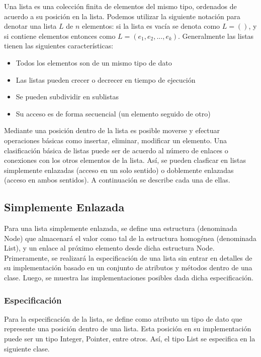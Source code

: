 Una lista es una colección finita de elementos del mismo tipo, ordenados de acuerdo a su posición en la lista. Podemos utilizar la siguiente notación para denotar una lista $L$ de $n$ elementos: si la lista es vacía se denota como $L=()$, y si contiene elementos entonces como $L=(e_1, e_2, ..., e_k)$. Generalmente las listas tienen las siguientes características:
\begin{itemize}
\item Todos los elementos son de un mismo tipo de dato
\item Las listas pueden crecer o decrecer en tiempo de ejecución
\item Se pueden subdividir en sublistas
\item Su acceso es de forma secuencial (un elemento seguido de otro)
\end{itemize}

Mediante una posición dentro de la lista es posible moverse y efectuar operaciones básicas como insertar, eliminar, modificar un elemento. Una clasificación básica de listas puede ser de acuerdo al número de enlaces o conexiones con los otros elementos de la lista. Así, se pueden clasficar en listas simplemente enlazadas (acceso en un solo sentido) o doblemente enlazadas (acceso en ambos sentidos). A continuación se describe cada una de ellas.

\subsection{Simplemente Enlazada}
Para una lista simplemente enlazada, se define una estructura (denominada Node) que almacenará el valor como tal de la estructura homogénea (denominada List), y un enlace al próximo elemento desde dicha estructura Node. Primeramente, se realizará la especificación de una lista sin entrar en detalles de su implementación basado en un conjunto de atributos y métodos dentro de una clase. Luego, se muestra las implementaciones posibles dada dicha especificación.

\subsubsection{Especificación}

Para la especificación de la lista, se define como atributo un tipo de dato que represente una posición dentro de una lista. Esta posición en su implementación puede ser un tipo Integer, Pointer, entre otros. Así, el tipo List se especifica en la siguiente clase.

